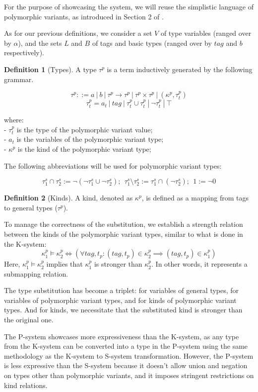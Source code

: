 \documentclass[a4paper,11pt,oneside]{article}
\theoremstyle{definition}
\newtheorem{defsec}{Definition}[section]
\begin{document}
For the purpose of showcasing the system, we will reuse the simplistic language of polymorphic variants, as introduced in Section 2 of \cite{Castagna_2016}.

As for our previous definitions, we consider a set $V$ of type variables (ranged over by $\alpha$), and the sets $L$ and $B$ of tags and basic types (ranged over by $tag$ and $b$ respectively).

\begin{defsec}[Types]
  A type $\tau^p$ is a term inductively generated by the following grammar.

  $$ \tau^p ::= a\ |\ b\ |\ \tau^p \rightarrow \tau^p\ |\ \tau^p \times \tau^p\ |\ (\kappa^p, \tau^p_t) $$
  $$ \tau^p_t = a_t\ |\ tag\ |\ \tau^p_t \cup \tau^p_t\ |\ \neg \tau^p_t\ |\ \top $$

  where:\\
  - $\tau^p_t$ is the type of the polymorphic variant value; \\
  - $a_t$ is the variables of the polymorphic variant type; \\
  - $\kappa^p$ is the kind of the polymorphic variant type;
\end{defsec}

The following abbreviations will be used for polymorphic variant types:

$$ \tau_1^s \cap \tau_2^s := \neg(\neg\tau_1^s \cup \neg\tau_2^s);\ \ \tau_1^s \setminus \tau_2^s := \tau_1^s \cap (\neg\tau_2^s);\ \ 1 := \neg 0 $$

\begin{defsec}[Kinds]
  A kind, denoted as $\kappa^p$, is defined as a mapping from tags to general types ($\tau^p$).
\end{defsec}

To manage the correctness of the substitution, we establish a strength relation between the kinds of the polymorphic variant types, similar to what is done in the K-system:
$$ \kappa_1^p \vDash \kappa_2^p \Leftrightarrow (\forall tag, t_p: (tag,t_p) \in \kappa_2^p \implies (tag,t_p) \in \kappa_1^p)$$
Here, $\kappa_1^p \vDash \kappa_2^p$ implies that $\kappa_1^p$ is stronger than $\kappa_2^p$. In other words, it represents a submapping relation.

The type substitution has become a triplet: for variables of general types, for variables of polymorphic variant types, and for kinds of polymorphic variant types. And for kinds, we necessitate that the substituted kind is stronger than the original one.

The P-system showcases more expressiveness than the K-system, as any type from the K-system can be converted into a type in the P-system using the same methodology as the K-system to S-system transformation. However, the P-system is less expressive than the S-system because it doesn't allow union and negation on types other than polymorphic variants, and it imposes stringent restrictions on kind relations.
\end{document}
